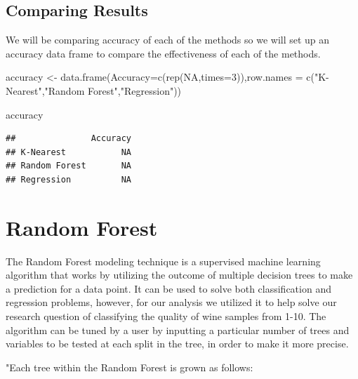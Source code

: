 \documentclass[
]{book}
\newenvironment{Shaded}{\begin{snugshade}}{\end{snugshade}}
\newcommand{\AttributeTok}[1]{\textcolor[rgb]{0.77,0.63,0.00}{#1}}
\newcommand{\ConstantTok}[1]{\textcolor[rgb]{0.00,0.00,0.00}{#1}}
\newcommand{\DecValTok}[1]{\textcolor[rgb]{0.00,0.00,0.81}{#1}}
\newcommand{\FunctionTok}[1]{\textcolor[rgb]{0.00,0.00,0.00}{#1}}
\newcommand{\NormalTok}[1]{#1}
\newcommand{\OtherTok}[1]{\textcolor[rgb]{0.56,0.35,0.01}{#1}}
\newcommand{\StringTok}[1]{\textcolor[rgb]{0.31,0.60,0.02}{#1}}
\begin{document}
\hypertarget{comparing-results}{%
\section{Comparing Results}\label{comparing-results}}

We will be comparing accuracy of each of the methods so we will set up an accuracy data frame to compare the effectiveness of each of the methods.

\begin{Shaded}
\begin{Highlighting}[]
\NormalTok{accuracy }\OtherTok{\textless{}{-}} \FunctionTok{data.frame}\NormalTok{(}\AttributeTok{Accuracy=}\FunctionTok{c}\NormalTok{(}\FunctionTok{rep}\NormalTok{(}\ConstantTok{NA}\NormalTok{,}\AttributeTok{times=}\DecValTok{3}\NormalTok{)),}\AttributeTok{row.names =} \FunctionTok{c}\NormalTok{(}\StringTok{"K{-}Nearest"}\NormalTok{,}\StringTok{"Random Forest"}\NormalTok{,}\StringTok{"Regression"}\NormalTok{))}

\NormalTok{accuracy}
\end{Highlighting}
\end{Shaded}

\begin{verbatim}
##               Accuracy
## K-Nearest           NA
## Random Forest       NA
## Regression          NA
\end{verbatim}

\hypertarget{random-forest}{%
\chapter{Random Forest}\label{random-forest}}

The Random Forest modeling technique is a supervised machine learning algorithm that works by utilizing the outcome of multiple decision trees to make a prediction for a data point. It can be used to solve both classification and regression problems, however, for our analysis we utilized it to help solve our research question of classifying the quality of wine samples from 1-10. The algorithm can be tuned by a user by inputting a particular number of trees and variables to be tested at each split in the tree, in order to make it more precise.

"Each tree within the Random Forest is grown as follows:
\end{document}
